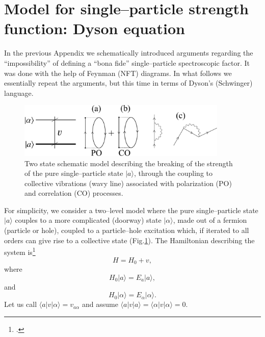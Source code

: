 \section[Single--particle strength function]{Model for single--particle strength function:
 Dyson equation}\label{C6AppB}
In the previous Appendix we schematically introduced  arguments regarding the ``impossibility'' of defining a ``bona fide'' single--particle spectroscopic factor. It was done with the help of Feynman (NFT) diagrams. In what follows we essentially repeat the arguments, but this time in terms of Dyson's (Schwinger) language.
 \begin{figure}
\centerline{\includegraphics*[width=10cm,angle=0]{C6/figs_C6/fig6_B1}}
\caption{Two state schematic model describing the breaking of the strength of the pure single--particle state $|a\rangle$, through the coupling to collective vibrations (wavy line) associated with polarization (PO) and correlation (CO) processes.}\label{fig6_B1}
\end{figure}
For simplicity, we consider a two--level model where the pure single--particle state $|a\rangle$ couples to a more complicated  (doorway) state
$|\alpha\rangle$, made out of a fermion (particle or hole), coupled to a particle--hole excitation which, if iterated to all orders can give rise to a collective state (Fig.\ref{fig6_B1}). The Hamiltonian describing the system is\footnote{ \cite{Bohr:69}.}
 \begin{equation}
 H=H_0+v,
 \end{equation}
 where
  \begin{equation}
  H_0|a\rangle=E_a|a\rangle,
  \end{equation}
  and
    \begin{equation}
    H_0|\alpha\rangle=E_\alpha|\alpha\rangle.
    \end{equation}
  Let us call $\langle a|v|\alpha\rangle=v_{a\alpha}$ and assume $\langle a|v|a\rangle=\langle \alpha|v|\alpha \rangle=0$.
  
